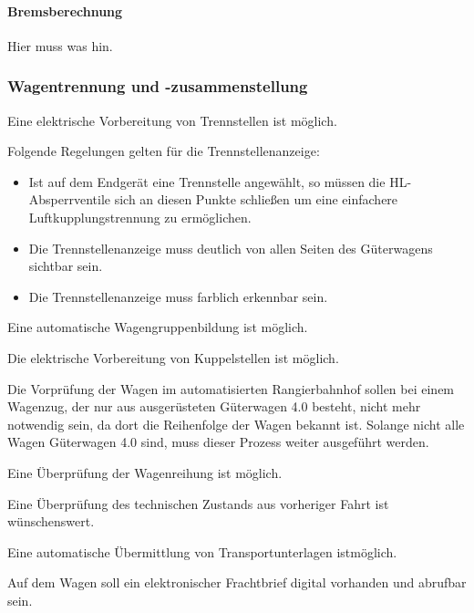 \paragraph{Bremsberechnung}
Hier muss was hin.

\subsubsection{Wagentrennung und -zusammenstellung}
\begin{feat}
Eine elektrische Vorbereitung von Trennstellen ist möglich.
\end{feat}
\begin{rem} [zu Anf. 49]
Folgende Regelungen gelten für die Trennstellenanzeige:
\begin{itemize}
    \item Ist auf dem Endgerät eine Trennstelle angewählt, so müssen die \acrshort{HL}-Absperrventile sich an diesen Punkte schließen um eine einfachere Luftkupplungstrennung zu ermöglichen.
    \item Die Trennstellenanzeige muss deutlich von allen Seiten des Güterwagens sichtbar sein.
    \item Die Trennstellenanzeige muss farblich erkennbar sein.
\end{itemize}
\end{rem}
\begin{feat}
Eine automatische Wagengruppenbildung ist möglich.
\end{feat}
\begin{feat}
Die elektrische Vorbereitung von Kuppelstellen ist möglich.
\end{feat}
Die Vorprüfung der Wagen im automatisierten Rangierbahnhof sollen bei einem Wagenzug, der nur aus ausgerüsteten Güterwagen 4.0 besteht, nicht mehr notwendig sein, da dort die Reihenfolge der Wagen bekannt ist. Solange nicht alle Wagen Güterwagen 4.0 sind, muss dieser Prozess weiter ausgeführt werden.
\begin{feat}
Eine Überprüfung der Wagenreihung ist möglich.
\end{feat}
\begin{feat}
Eine Überprüfung des technischen Zustands aus vorheriger Fahrt ist wünschenswert.
\end{feat}
\begin{feat}
Eine automatische Übermittlung von Transportunterlagen ist\newline möglich.
\end{feat}
\begin{feat}
Auf dem Wagen soll ein elektronischer Frachtbrief digital vorhanden und abrufbar sein.
\end{feat}

